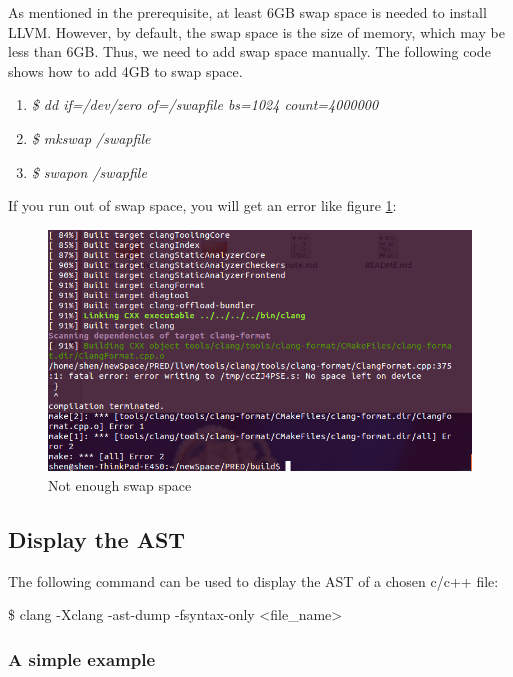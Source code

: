 As mentioned in the prerequisite, at least 6GB swap space is needed to install LLVM. However, by default, the swap space is the size of memory, which may be less than 6GB. Thus, we need to add swap space manually. The following code shows how to add 4GB to swap space.

    \begin{enumerate}
        \item \textit{\$ dd if=/dev/zero of=/swapfile bs=1024 count=4000000}
        \item \textit{\$ mkswap /swapfile}
        \item \textit{\$ swapon /swapfile}
    \end{enumerate}
    


If you run out of swap space, you will get an error like figure \ref{fig:NotEnoughSwapSpace}: 


    \begin{figure}[H]
        \centering
        \includegraphics[scale = 0.32]
        {Images/experiments/errorMessage.png}
        \caption[Not enough swap space]%
        {Not enough swap space}
        \label{fig:NotEnoughSwapSpace}
    \end{figure}

\subsection{Display the AST}

The following command can be used to display the AST of a chosen c/c++ file: \newline

\$ clang -Xclang -ast-dump -fsyntax-only <file\_name>

\subsubsection{A simple example}

